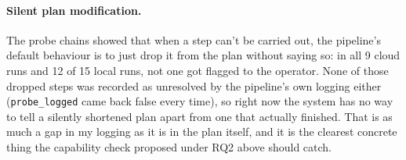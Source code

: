 \paragraph{Silent plan modification.} The probe chains showed that when a
step can't be carried out, the pipeline's default behaviour is to just drop
it from the plan without saying so: in all 9 cloud runs and 12 of 15 local
runs, not one got flagged to the operator. None of those dropped steps was
recorded as unresolved by the pipeline's own logging either
(\texttt{probe\_logged} came back false every time), so right now the system
has no way to tell a silently shortened plan apart from one that actually
finished. That is as much a gap in my logging as it is in the plan itself,
and it is the clearest concrete thing the capability check proposed under RQ2
above should catch.
